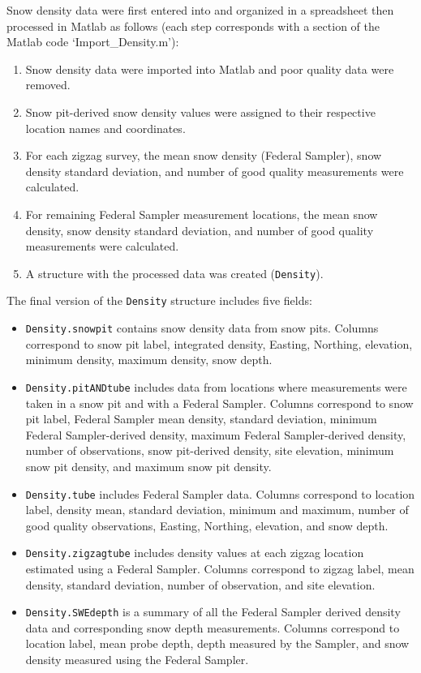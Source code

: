 \documentclass{sfuthesis}
\begin{document}
\begin{appendices}
Snow density data were first entered into and organized in a spreadsheet then processed in Matlab as follows (each step corresponds with a section of the Matlab code `Import\_Density.m'): 
\begin{enumerate}
\item Snow density data were imported into Matlab and poor quality data were removed. 
\item Snow pit-derived snow density values were assigned to their respective location names and coordinates.
\item For each zigzag survey, the mean snow density (Federal Sampler), snow density standard deviation, and number of good quality measurements were calculated.
\item For remaining Federal Sampler measurement locations, the mean snow density, snow density standard deviation, and number of good quality measurements were calculated. 
\item A structure with the processed data was created (\texttt{Density}).
\end{enumerate}

The final version of the \texttt{Density} structure includes five fields:
\begin{itemize}
\item[]\texttt{Density.snowpit} contains snow density data from snow pits. Columns correspond to snow pit label, integrated density, Easting, Northing, elevation, minimum density, maximum density, snow depth.
\item[]\texttt{Density.pitANDtube} includes data from locations where measurements were taken in a snow pit and with a Federal Sampler. Columns correspond to snow pit label, Federal  Sampler mean density, standard deviation, minimum Federal Sampler-derived density, maximum Federal Sampler-derived density, number of observations, snow pit-derived density, site elevation, minimum snow pit density, and maximum snow pit density.
\item[]\texttt{Density.tube} includes Federal Sampler data. Columns correspond to location label, density mean, standard deviation, minimum and maximum, number of good quality observations, Easting, Northing, elevation, and snow depth. 
\item[]\texttt{Density.zigzagtube} includes density values at each zigzag location estimated using a Federal Sampler. Columns correspond to zigzag label, mean density, standard deviation, number of observation, and site elevation. 
\item[]\texttt{Density.SWEdepth} is a summary of all the Federal Sampler derived density data and corresponding snow depth measurements. Columns correspond to location label, mean probe depth, depth measured by the Sampler, and snow density measured using the Federal Sampler. 
\end{itemize}


\end{appendices}
\end{document}
